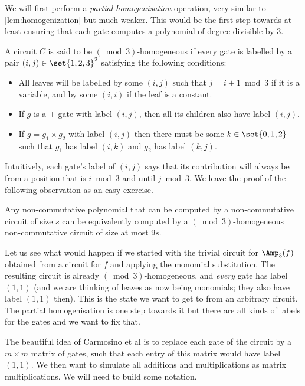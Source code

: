 We will first perform a \emph{partial homogenisation} operation, very similar to \autoref{lem:homogenization} but much weaker. This would be the first step towards at least ensuring that each gate computes a polynomial of degree divisible by $3$. 

\begin{definition} A circuit $C$ is said to be $(\bmod{3})$-homogeneous if every gate is labelled by a pair $(i,j) \in \set{1,2,3}^2$ satisfying the following conditions: 
  \begin{itemize}
  \item All leaves will be labelled by some $(i,j)$ such that $j = i+1 \bmod 3$ if it is a variable, and by some $(i,i)$ if the leaf is a constant.
  \item If $g$ is a $+$ gate with label $(i,j)$, then all its children also have label $(i,j)$.
  \item If $g = g_1 \times g_2$ with label $(i,j)$ then there must be some $k \in \set{0,1,2}$ such that $g_1$ has label $(i,k)$ and $g_2$ has label $(k,j)$. \qedhere
  \end{itemize}
\end{definition}

Intuitively, each gate's label of $(i,j)$ says that its contribution will always be from a position that is $i \bmod 3$ and until $j\bmod 3$. We leave the proof of the following observation as an easy exercise. 

\begin{observation}
  Any non-commutative polynomial that can be computed by a non-commutative circuit of size $s$ can be equivalently computed by a $(\bmod{3})$-homogeneous non-commutative circuit of size at most $9s$.  
\end{observation}

Let us see what would happen if we started with the trivial circuit for $\Amp_3(f)$ obtained from a circuit for $f$ and applying the monomial substitution. The resulting circuit is already $(\bmod{3})$-homogeneous, and \emph{every} gate has label $(1,1)$ (and we are thinking of leaves as now being monomials; they also have label $(1,1)$ then). This is the state we want to get to from an arbitrary circuit. The partial homogenisation is one step towards it but there are all kinds of labels for the gates and we want to fix that.

The beautiful idea of Carmosino et al \cite{CILM18} is to replace each gate of the circuit by a $m\times m$ matrix of gates, such that each entry of this matrix would have label $(1,1)$. We then want to simulate all additions and multiplications as matrix multiplications. We will need to build some notation. 

